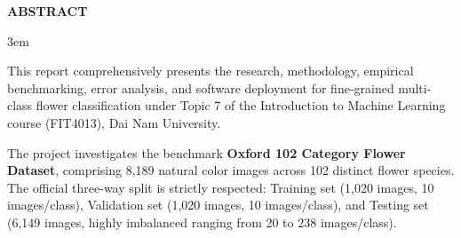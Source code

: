 \documentclass[../DoAn.tex]{subfiles}
\begin{document}
\begin{center}
    \Large{\textbf{ABSTRACT}}
\end{center}
\vspace{0.8cm}

\sloppy
\emergencystretch 3em

This report comprehensively presents the research, methodology, empirical benchmarking, error analysis, and software deployment for fine-grained multi-class flower classification under Topic 7 of the Introduction to Machine Learning course (FIT4013), Dai Nam University.

The project investigates the benchmark \textbf{Oxford 102 Category Flower Dataset}, comprising 8,189 natural color images across 102 distinct flower species. The official three-way split is strictly respected: Training set (1,020 images, 10 images/class), Validation set (1,020 images, 10 images/class), and Testing set (6,149 images, highly imbalanced ranging from 20 to 238 images/class).
\end{document}
